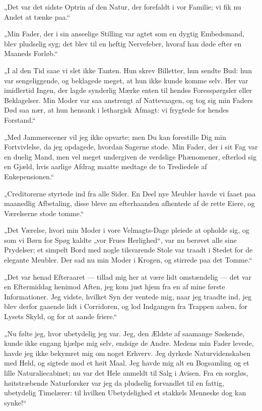 \documentclass[12pt,a4paper]{book}
\newcommand{\apage}[1]{\marginnote{\footnotesize\textit{[#1]}}}
\begin{document}
„Det var det sidste Optrin af den Natur, der forefaldt i vor Familie; vi fik nu Andet at tænke paa.“

„Min Fader, der i sin anseelige Stilling var agtet som en dygtig Embedsmand, blev pludselig syg; det blev til en heftig Nervefeber, hvoraf han døde efter en Maaneds Forløb.“

„I al den Tid saae vi slet ikke Tanten. Hun skrev Billetter, hun sendte Bud: hun var sengeliggende, og beklagede meget, at hun ikke kunde komme selv. Her var imidlertid Ingen, der lagde synderlig Mærke enten til hendes Foresspørgsler eller Beklagelser. Min Moder var saa anstrengt af Nattevaagen, og tog sig min Faders Død saa nær, at hun hensank i lethargisk Afmagt: vi frygtede for hendes Forstand.“

„Med Jammerscener vil jeg ikke opvarte; men Du kan forestille Dig min Fortvivlelse, da jeg opdagede, hvordan Sagerne stode. Min Fader, der i sit Fag var en duelig Mand, men vel meget undergiven de verdslige Phænomener, efterlod sig en Gjæld, hvis aarlige Afdrag maatte medtage de to Trediedele af Enkepensionen.“

„Creditorerne styrtede ind fra alle Sider. En Deel nye Meubler havde vi faaet paa maanedlig Afbetaling, disse bleve nu efterhaanden afhentede af de rette Eiere, og Værelserne stode tomme.“

„Det Værelse, hvori min Moder i vore Velmagts-Dage pleiede at opholde sig, og som vi Børn for Spøg kaldte „vor Frues Herlighed“, var nu berøvet alle sine Prydelser; et simpelt Bord med nogle tilsvarende Stole var traadt i Stedet for de elegante Meubler. Der sad nu min Moder i Krogen, og stirrede paa det Tomme.“

„Det var henad Efteraaret — tillad mig her at være lidt \apage{77}
omstændelig — det var en Eftermiddag henimod Aften, jeg kom just hjem fra en af mine første Informationer. Jeg vidste, hvilket Syn der ventede mig, naar jeg traadte ind, jeg blev derfor gaaende lidt i Corridoren, og lod Indgangen fra Trappen aaben, for Lysets Skyld, og for at aande friere.“

„Nu følte jeg, hvor ubetydelig jeg var. Jeg, den Ældste af saamange Søskende, kunde ikke engang hjælpe mig selv, endsige de Andre. Medens min Fader levede, havde jeg ikke bekymret mig om noget Erhverv. Jeg dyrkede Naturvidenskaben med Held, og sigtede mod et høit Maal. Jeg havde mig alt en Bogsamling og et lille Naturaliecabinet; nu var det Hele anmeldt til Salg i Avisen. Fra en sorgløs, høitstræbende Naturforsker var jeg da pludselig forvandlet til en fattig, ubetydelig Timelærer: til hvilken Ubetydelighed et stakkels Menneske dog kan synke!“
\end{document}
